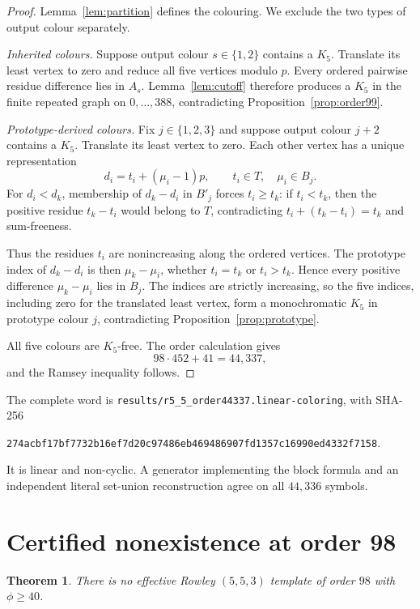 \documentclass[11pt]{article}
\newtheorem{theorem}{Theorem}[section]
\theoremstyle{definition}
\theoremstyle{remark}
\newcommand{\code}[1]{\texttt{#1}}
\newcommand{\sha}[1]{\begingroup\ttfamily\scriptsize\urlstyle{same}\nolinkurl{#1}\endgroup}
\begin{document}
\begin{proof}
Lemma~\ref{lem:partition} defines the colouring. We exclude the two types of
output colour separately.

\emph{Inherited colours.}
Suppose output colour $s\in\{1,2\}$ contains a $K_5$. Translate its least
vertex to zero and reduce all five vertices modulo $p$. Every ordered
pairwise residue difference lies in $A_s$. Lemma~\ref{lem:cutoff} therefore
produces a $K_5$ in the finite repeated graph on
$0,\ldots,388$, contradicting Proposition~\ref{prop:order99}.

\emph{Prototype-derived colours.}
Fix $j\in\{1,2,3\}$ and suppose output colour $j+2$ contains a $K_5$.
Translate its least vertex to zero. Each other vertex has a unique
representation
\[
  d_i=t_i+(\mu_i-1)p,\qquad t_i\in T,\quad\mu_i\in B_j.
\]
For $d_i<d_k$, membership of $d_k-d_i$ in $B'_j$ forces
$t_i\ge t_k$: if $t_i<t_k$, then the positive residue
$t_k-t_i$ would belong to $T$, contradicting
$t_i+(t_k-t_i)=t_k$ and sum-freeness.

Thus the residues $t_i$ are nonincreasing along the ordered vertices. The
prototype index of $d_k-d_i$ is then $\mu_k-\mu_i$, whether
$t_i=t_k$ or $t_i>t_k$. Hence every positive difference
$\mu_k-\mu_i$ lies in $B_j$. The indices are strictly increasing, so the
five indices, including zero for the translated least vertex, form a
monochromatic $K_5$ in prototype colour $j$, contradicting
Proposition~\ref{prop:prototype}.

All five colours are $K_5$-free. The order calculation gives
\[
  98\cdot452+41=44{,}337,
\]
and the Ramsey inequality follows.
\end{proof}

The complete word is
\code{results/r5\_5\_order44337.linear-coloring}, with SHA-256
\begin{center}
\sha{274acbf17bf7732b16ef7d20c97486eb469486907fd1357c16990ed4332f7158}.
\end{center}
It is linear and non-cyclic. A generator implementing the block formula and
an independent literal set-union reconstruction agree on all $44{,}336$
symbols.

\section{Certified nonexistence at order 98}

\begin{theorem}
\label{thm:hole}
There is no effective Rowley $(5,5,3)$ template of order $98$ with
$\phi\ge40$.
\end{theorem}
\end{document}
